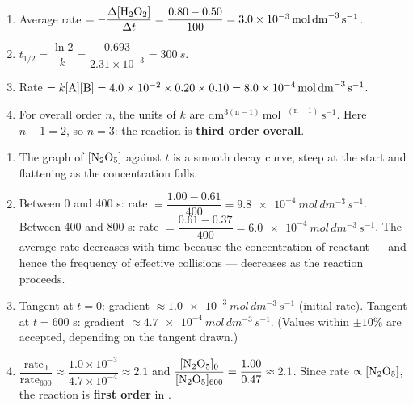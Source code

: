 \documentclass[11pt]{article}
\begin{document}
\begin{corrige}
\begin{enumerate}
\item Average rate $= -\dfrac{\Delta[\ce{H2O2}]}{\Delta t} = \dfrac{0.80 - 0.50}{100} = \SI{3.0e-3}{mol\,dm^{-3}\,s^{-1}}$.
\item $t_{1/2} = \dfrac{\ln 2}{k} = \dfrac{0.693}{2.31\times 10^{-3}} = \SI{300}{s}$.
\item Rate $= k[\ce{A}][\ce{B}] = 4.0\times 10^{-2} \times 0.20 \times 0.10 = \SI{8.0e-4}{mol\,dm^{-3}\,s^{-1}}$.
\item For overall order $n$, the units of $k$ are $\mathrm{dm^{3(n-1)}\,mol^{-(n-1)}\,s^{-1}}$. Here $n - 1 = 2$, so $n = 3$: the reaction is \textbf{third order overall}.
\end{enumerate}
\end{corrige}

\begin{corrige}
\begin{enumerate}
\item The graph of $[\ce{N2O5}]$ against $t$ is a smooth decay curve, steep at the start and flattening as the concentration falls.
\item Between 0 and 400 s: rate $= \dfrac{1.00 - 0.61}{400} = \SI{9.8e-4}{mol\,dm^{-3}\,s^{-1}}$. Between 400 and 800 s: rate $= \dfrac{0.61 - 0.37}{400} = \SI{6.0e-4}{mol\,dm^{-3}\,s^{-1}}$. The average rate decreases with time because the concentration of reactant — and hence the frequency of effective collisions — decreases as the reaction proceeds.
\item Tangent at $t = 0$: gradient $\approx \SI{1.0e-3}{mol\,dm^{-3}\,s^{-1}}$ (initial rate). Tangent at $t = 600$ s: gradient $\approx \SI{4.7e-4}{mol\,dm^{-3}\,s^{-1}}$. (Values within $\pm 10\%$ are accepted, depending on the tangent drawn.)
\item $\dfrac{\text{rate}_{0}}{\text{rate}_{600}} \approx \dfrac{1.0\times 10^{-3}}{4.7\times 10^{-4}} \approx 2.1$ and $\dfrac{[\ce{N2O5}]_{0}}{[\ce{N2O5}]_{600}} = \dfrac{1.00}{0.47} \approx 2.1$. Since rate $\propto [\ce{N2O5}]$, the reaction is \textbf{first order} in .
\end{enumerate}
\end{corrige}
\end{document}
